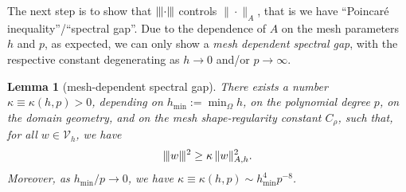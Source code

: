 \documentclass{amsart}
\newcommand{\norm}[2]{\|{#1}\|_{{#2}}}
\newcommand{\ndg}[1]{|\kern-.03cm \|{#1}|\kern-.03cm \|}
\newtheorem{lemma}[theorem]{Lemma}
\theoremstyle{definition}
\theoremstyle{remark}
\numberwithin{equation}{section}
\begin{document}
The next step is to show that $\ndg{\cdot}$ controls $\norm{\cdot}{A}$, that is we have ``Poincar\'e inequality''/``spectral gap''. Due to the dependence of $A$ on the mesh parameters $h$ and $p$,  as expected, we can only show a \emph{mesh dependent spectral gap}, with the respective constant degenerating as $h\to 0$ and/or $p\to\infty$.
\begin{lemma}[mesh-dependent spectral gap]\label{lemma:mesh-dependent spectral gap}
    There exists a number $\kappa\equiv\kappa(h,p)>0$, depending  {on} $h_{\min}:=\min_{\Omega}h$, on the polynomial degree $p$, on the domain geometry, and on the mesh shape-regularity constant $C_\rho$, such that, for all $w \in  {\mathcal{V}}_{h}$, we have
    \begin{equation}\label{mesh-dependent spectral gap}
    \ndg{w}^2 \geq \kappa\, \norm{w}{A,h}^2.
    \end{equation}
    Moreover, as $h_{\min}/ p\to 0$, we have $\kappa\equiv \kappa(h,p)\sim h^4_{\min} p^{-8}$.
    \end{lemma}
\end{document}
